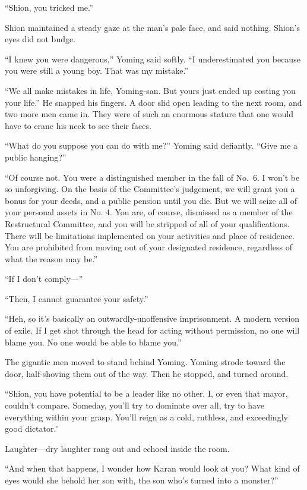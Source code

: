 ``Shion, you tricked me.''

Shion maintained a steady gaze at the man's pale face, and said nothing.
Shion's eyes did not budge.

``\el I knew you were dangerous,'' Yoming said softly. ``I underestimated
you because you were still a young boy. That was my mistake.''

``We all make mistakes in life, Yoming-san. But yours just ended up
costing you your life.'' He snapped his fingers. A door slid open
leading to the next room, and two more men came in. They were of such an
enormous stature that one would have to crane his neck to see their
faces.

``What do you suppose you can do with me?'' Yoming said defiantly.
``Give me a public hanging?''

``Of course not. You were a distinguished member in the fall of No.~6. I
won't be so unforgiving. On the basis of the Committee's judgement, we
will grant you a bonus for your deeds, and a public pension until you
die. But we will seize all of your personal assets in No. 4. You are, of
course, dismissed as a member of the Restructural Committee, and you
will be stripped of all of your qualifications. There will be
limitations implemented on your activities and place of residence. You
are prohibited from moving out of your designated residence, regardless
of what the reason may be.''

``If I don't comply---''

``Then, I cannot guarantee your safety.''

``Heh, so it's basically an outwardly-unoffensive imprisonment. A modern
version of exile. If I get shot through the head for acting without
permission, no one will blame you. No one would be able to blame you.''

The gigantic men moved to stand behind Yoming. Yoming strode toward the
door, half-shoving them out of the way. Then he stopped, and turned
around.

``Shion, you have potential to be a leader like no other. I, or even
that mayor, couldn't compare. Someday, you'll try to dominate over all,
try to have everything within your grasp. You'll reign as a cold,
ruthless, and exceedingly good dictator.''

Laughter---dry laughter rang out and echoed inside the room.

``And when that happens, I wonder how Karan would look at you? What kind
of eyes would she behold her son with, the son who's turned into a
monster?''

